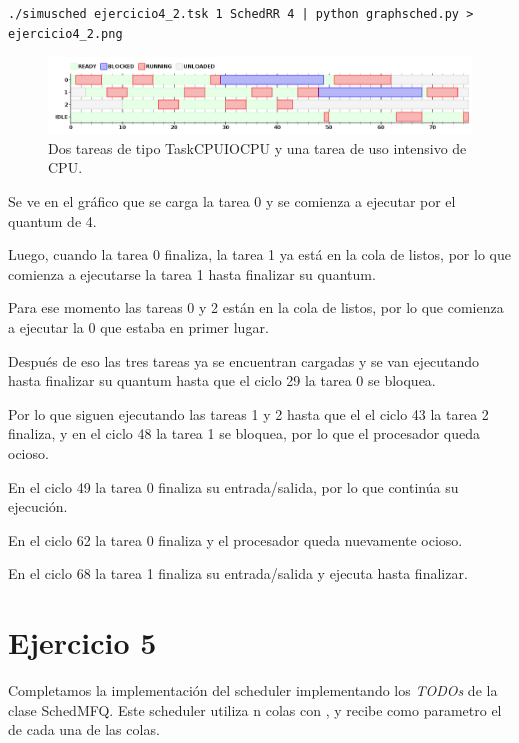 \begin{framed}
\begin{verbatim}
./simusched ejercicio4_2.tsk 1 SchedRR 4 | python graphsched.py > ejercicio4_2.png
\end{verbatim}
\end{framed}

\begin{figure}[h!]
  \caption{Dos tareas de tipo TaskCPUIOCPU y una tarea de uso intensivo de CPU.}
  \centering
    \includegraphics[width=1\textwidth]{img/ejercicio4_2.png}
\end{figure}

Se ve en el gr\'afico que se carga la tarea 0 y se comienza a ejecutar por el quantum de 4.

Luego, cuando la tarea 0 finaliza, la tarea 1 ya est\'a en la cola de listos, por lo que comienza a ejecutarse la tarea 1 hasta finalizar su quantum.

Para ese momento las tareas 0 y 2 est\'an en la cola de listos, por lo que comienza a ejecutar la 0 que estaba en primer lugar.

Despu\'es de eso las tres tareas ya se encuentran cargadas y se van ejecutando hasta finalizar su quantum hasta que el ciclo 29 la tarea 0 se bloquea.

Por lo que siguen ejecutando las tareas 1 y 2 hasta que el el ciclo 43 la tarea 2 finaliza, y en el ciclo 48 la tarea 1 se bloquea, por lo que el procesador queda ocioso.

En el ciclo 49 la tarea 0 finaliza su entrada/salida, por lo que contin\'ua su ejecuci\'on. 

En el ciclo 62 la tarea 0 finaliza y el procesador queda nuevamente ocioso.

En el ciclo 68 la tarea 1 finaliza su entrada/salida y ejecuta hasta finalizar.


\section{Ejercicio 5}

Completamos la implementaci\'on del scheduler \mfq implementando los \textit{TODOs} de la clase SchedMFQ. Este scheduler utiliza n colas con \rr, y recibe como parametro el \quantum de cada una de las colas.

